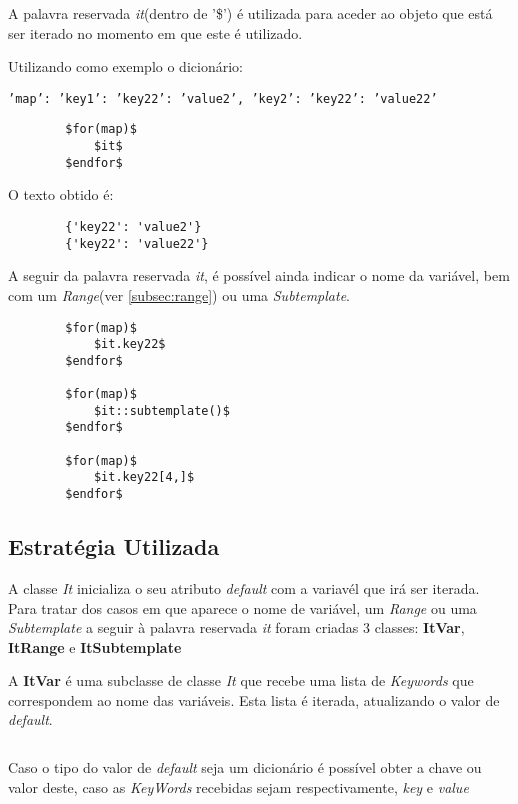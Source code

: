 \documentclass[../relatorio.tex]{subfiles}
\begin{document}
    A palavra reservada \textit{it}(dentro de '\$') é utilizada
    para aceder ao objeto que está ser iterado no momento em que
    este é utilizado.

    Utilizando como exemplo o dicionário:
    
    \texttt{'map': {'key1': {'key22': 'value2'}, 'key2': {'key22': 'value22'}}}

    \begin{verbatim}
        $for(map)$
            $it$
        $endfor$
    \end{verbatim}

    O texto obtido é:
    \begin{verbatim}
        {'key22': 'value2'}
        {'key22': 'value22'}
    \end{verbatim}

    A seguir da palavra reservada \textit{it}, é possível ainda indicar
    o nome da variável, bem com um \textit{Range}(ver \ref{subsec:range})
    ou uma \textit{Subtemplate}.

    \begin{verbatim}
        $for(map)$
            $it.key22$
        $endfor$

        $for(map)$
            $it::subtemplate()$
        $endfor$

        $for(map)$
            $it.key22[4,]$
        $endfor$
    \end{verbatim}

    \subsection*{Estratégia Utilizada}

    A classe \textit{It} inicializa o seu atributo \textit{default}
    com a variavél que irá ser iterada. Para tratar dos casos em que
    aparece o nome de variável, um \textit{Range} ou uma \textit{Subtemplate}
    a seguir à palavra reservada \textit{it} foram criadas 3 classes: \textbf{ItVar}, 
    \textbf{ItRange} e \textbf{ItSubtemplate}


    A \textbf{ItVar} é uma subclasse de classe \textit{It} que recebe uma lista de \textit{Keywords}
    que correspondem ao nome das variáveis. Esta lista é iterada,
    atualizando o valor de \textit{default}. 
    
    \inputminted[firstline=11, lastline=17]{py}{../modules/It/ItVar.py}
    
    Caso o tipo do valor de \textit{default} seja um dicionário é possível obter
    a chave ou valor deste, caso as \textit{KeyWords} recebidas sejam respectivamente,
    \textit{key} e \textit{value}
\end{document}
